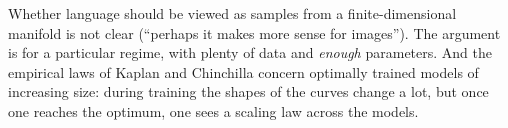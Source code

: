\begin{caution}
Whether language should be viewed as samples from a finite-dimensional manifold is not clear (``perhaps it makes more sense for images''). The argument is for a particular regime, with plenty of data and \emph{enough} parameters. And the empirical laws of Kaplan and Chinchilla concern optimally trained models of increasing size: during training the shapes of the curves change a lot, but once one reaches the optimum, one sees a scaling law across the models.
\end{caution}


